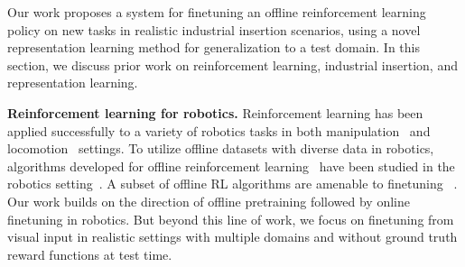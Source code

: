 
Our work proposes a system for finetuning an offline reinforcement learning policy on new tasks in realistic industrial insertion scenarios, using a novel representation learning method for generalization to a test domain. In this section, we discuss prior work on reinforcement learning, industrial insertion, and representation learning.

\textbf{Reinforcement learning for robotics.}
Reinforcement learning has been applied successfully to a variety of robotics tasks in both manipulation~\cite{peters2008baseball, kober2008mp,deisenroth2011pilco, levine2016gps, levine2017grasping, zhu2019hands} and locomotion~\cite{giusti15trails, nakanishi2004bipedlfd, kalakrishnan09terraintemplates} settings.
To utilize offline datasets with diverse data in robotics, algorithms developed for offline reinforcement learning~\cite{fujimoto19bcq, kumar2020cql, nair2020awac, wu2019brac} have been studied in the robotics setting~\cite{singh2020cog, singh2020parrot, chebotar2021actionable, kalashnikov2021mtopt, kumar2021workflow}.
A subset of offline RL algorithms are amenable to finetuning ~\cite{nair2020awac,villaflor2020finetuning, meng2021starcraft, lee2021finetuning,kostrikov2021iql}.
Our work builds on the direction of offline pretraining followed by online finetuning in robotics.
But beyond this line of work, we focus on finetuning from visual input in realistic settings with multiple domains and without ground truth reward functions at test time.

